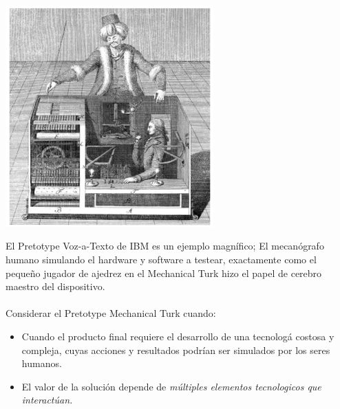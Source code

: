 \documentclass{article}
\begin{document}
\begin{enumerate}
 \begin{center}
    \includegraphics[width=0.6\textwidth]{mechanical_turk}
\end{center}
 
 El Pretotype Voz-a-Texto de IBM es un ejemplo magn\'ifico; El mecan\'ografo humano simulando el hardware y software a testear, exactamente como el peque\~no jugador de ajedrez en el Mechanical Turk hizo el papel de cerebro maestro del dispositivo.
 \\ \\
 Considerar el Pretotype Mechanical Turk cuando:
 
 \begin{itemize}
 
 \item Cuando el producto final requiere el desarrollo de una tecnolog\'a costosa y compleja, cuyas acciones y resultados podr\'ian ser simulados por los seres humanos.
 
 \item El valor de la soluci\'on depende de \textit{m\'ultiples elementos tecnologicos que interact\'uan.}
 
 \end{itemize}
 

\end{enumerate}
\end{document}
